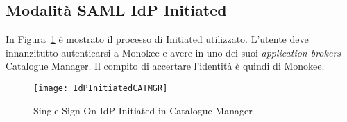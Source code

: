 \subsection{Modalità SAML IdP Initiated}
In Figura~\ref{fig:idpinitiatedcatmgr} è mostrato il processo di   Initiated utilizzato. L'utente deve innanzitutto autenticarsi a Monokee e avere in uno dei suoi \textit{application brokers} Catalogue Manager. Il compito di accertare l'identità è quindi di Monokee.

\newpage

\begin{figure}[hbpc]
  \begin{center}
    \texttt{[image: IdPInitiatedCATMGR]}
  \caption[Single Sign On IdP Initiated in Catalogue Manager]{Single Sign On IdP Initiated in Catalogue Manager}
  \label{fig:idpinitiatedcatmgr}
  \end{center} 
\end{figure}

